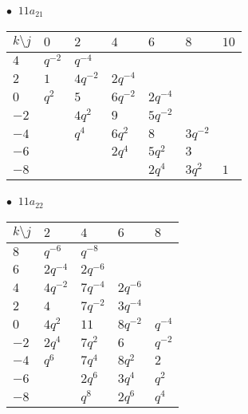 \begin{minipage}{\linewidth}
$\bullet\ $ $11a_{21}$ \vspace{0.5em} \\
\begin{tabular}{l|llllll}
$k \setminus j$ & $0$ & $2$ & $4$ & $6$ & $8$ & $10$ \\
\hline
$4$ & $q^{-2}$ & $q^{-4}$ &  &  &  &  \\
$2$ & $1$ & $4q^{-2}$ & $2q^{-4}$ &  &  &  \\
$0$ & $q^{2}$ & $5$ & $6q^{-2}$ & $2q^{-4}$ &  &  \\
$-2$ &  & $4q^{2}$ & $9$ & $5q^{-2}$ &  &  \\
$-4$ &  & $q^{4}$ & $6q^{2}$ & $8$ & $3q^{-2}$ &  \\
$-6$ &  &  & $2q^{4}$ & $5q^{2}$ & $3$ &  \\
$-8$ &  &  &  & $2q^{4}$ & $3q^{2}$ & $1$ \\
\end{tabular}
\vspace{2em}
\end{minipage}
%
\begin{minipage}{\linewidth}
$\bullet\ $ $11a_{22}$ \vspace{0.5em} \\
\begin{tabular}{l|llll}
$k \setminus j$ & $2$ & $4$ & $6$ & $8$ \\
\hline
$8$ & $q^{-6}$ & $q^{-8}$ &  &  \\
$6$ & $2q^{-4}$ & $2q^{-6}$ &  &  \\
$4$ & $4q^{-2}$ & $7q^{-4}$ & $2q^{-6}$ &  \\
$2$ & $4$ & $7q^{-2}$ & $3q^{-4}$ &  \\
$0$ & $4q^{2}$ & $11$ & $8q^{-2}$ & $q^{-4}$ \\
$-2$ & $2q^{4}$ & $7q^{2}$ & $6$ & $q^{-2}$ \\
$-4$ & $q^{6}$ & $7q^{4}$ & $8q^{2}$ & $2$ \\
$-6$ &  & $2q^{6}$ & $3q^{4}$ & $q^{2}$ \\
$-8$ &  & $q^{8}$ & $2q^{6}$ & $q^{4}$ \\
\end{tabular}
\vspace{2em}
\end{minipage}
%
